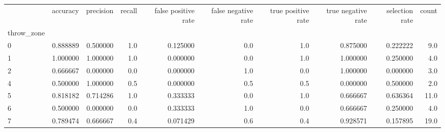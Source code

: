 \begin{tabular}{lrrrrrrrrr}
\toprule
{} &  accuracy &  precision &  recall &  false positive rate &  false negative rate &  true positive rate &  true negative rate &  selection rate &  count \\
throw\_zone &           &            &         &                      &                      &                     &                     &                 &        \\
\midrule
0          &  0.888889 &   0.500000 &     1.0 &             0.125000 &                  0.0 &                 1.0 &            0.875000 &        0.222222 &    9.0 \\
1          &  1.000000 &   1.000000 &     1.0 &             0.000000 &                  0.0 &                 1.0 &            1.000000 &        0.250000 &    4.0 \\
2          &  0.666667 &   0.000000 &     0.0 &             0.000000 &                  1.0 &                 0.0 &            1.000000 &        0.000000 &    3.0 \\
4          &  0.500000 &   1.000000 &     0.5 &             0.000000 &                  0.5 &                 0.5 &            0.000000 &        0.500000 &    2.0 \\
5          &  0.818182 &   0.714286 &     1.0 &             0.333333 &                  0.0 &                 1.0 &            0.666667 &        0.636364 &   11.0 \\
6          &  0.500000 &   0.000000 &     0.0 &             0.333333 &                  1.0 &                 0.0 &            0.666667 &        0.250000 &    4.0 \\
7          &  0.789474 &   0.666667 &     0.4 &             0.071429 &                  0.6 &                 0.4 &            0.928571 &        0.157895 &   19.0 \\
\bottomrule
\end{tabular}
